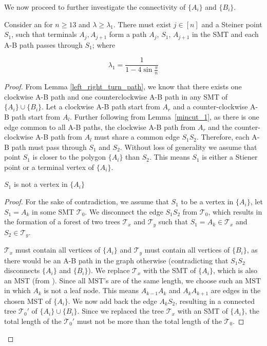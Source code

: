 We now proceed to further investigate the connectivity of $\{A_i\}$ and $\{B_i\}$. 

\begin{lemma} \label{steiner_path_from_A_to_A}
    Consider an \smtpoly for $n \ge 13$ and  $\lambda \ge \lambda_{1}$. There must exist $j \in [n]$ and a Steiner point $S_1$, such that terminals $A_j, A_{j + 1}$ form a path $A_j$, $S_1$, $A_{j+1}$ in the SMT and each A-B path passes through $S_1$; where 
    
    $$\lambda_{1} = \frac{1}{1 - 4 \sin \frac{\pi}{n}}$$
\end{lemma}

\begin{proof}
    From Lemma \ref{left_right_turn_path}, we know that there exists one clockwise A-B path and one counterclockwise A-B path in any SMT of $\{A_i\} \cup \{B_i\}$. Let a clockwise A-B path start from $A_r$ and a counter-clockwise A-B path start from $A_l$. Further following from Lemma~\ref{mincut_1}, as there is one edge common to all A-B paths, the clockwise A-B path from $A_r$ and the counter-clockwise A-B path from $A_l$ must share a common edge $S_1S_2$. Therefore, each A-B path must pass through $S_1$ and $S_2$. Without loss of generality we assume that point $S_1$ is closer to the polygon $\{A_i\}$ than $S_2$. This means $S_1$ is either a Stiener point or a terminal vertex of $\{A_i\}$.

    \begin{claim} \label{S_1_notin_A}
        $S_1$ is not a vertex in $\{A_i\}$
    \end{claim}
\begin{proof}
    For the sake of contradiction, we assume that $S_1$
     to be a vertex in $\{A_i\}$, let $S_1 = A_k$ in some SMT $\mathcal T_0$. We disconnect the edge $S_1S_2$ from $\mathcal T_0$, which results in the formation of a forest of two trees $\mathcal T_x$ and $\mathcal T_y$ such that $S_1 = A_k \in \mathcal T_x$ and $S_2 \in \mathcal T_y$.

    $\mathcal T_x$ must contain all vertices of $\{A_i\}$ and $\mathcal T_y$ must contain all vertices of $\{B_i\}$, as there would be an A-B path in the graph otherwise (contradicting that $S_1S_2$ disconnects $\{A_i\}$ and $\{B_i\}$). We replace $\mathcal T_x$ with the SMT of $\{A_i\}$, which is also an MST (from \cite{weng1995steiner}). Since all MST's are of the same length, we choose such an MST in which $A_k$ is not a leaf node. This means $A_{k-1}A_k$ and $A_kA_{k+1}$ are edges in the chosen MST of $\{A_i\}$. We now add back the edge $A_kS_2$, resulting in a connected tree $\mathcal T_0'$ of $\{A_i\} \cup \{B_i\}$. Since we replaced the tree $\mathcal T_x$ with an SMT of $\{A_i\}$, the total length of the $\mathcal T_0'$ must not be more than the total length of the $\mathcal T_0$.


\end{proof}
\end{proof}
